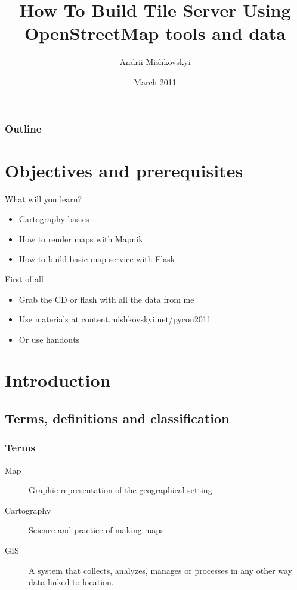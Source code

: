 \documentclass{beamer}
\begin{document}
\title{How To Build Tile Server Using OpenStreetMap tools and data}
\author{Andrii Mishkovskyi}
\date{March 2011}

\maketitle

\begin{frame}
  \frametitle{Outline}
  \tableofcontents
\end{frame}


\section{Objectives and prerequisites}

\begin{frame}{What will you learn?}
  \begin{itemize}
  \item Cartography basics
  \item How to render maps with Mapnik
  \item How to build basic map service with Flask
  \end{itemize}
\end{frame}

\begin{frame}{First of all}
  \begin{itemize}
  \item Grab the CD or flash with all the data from me
  \item Use materials at content.mishkovskyi.net/pycon2011
  \item Or use handouts
  \end{itemize}
\end{frame}

\section{Introduction}

\subsection{Terms, definitions and classification}

\begin{frame}
  \frametitle{Terms}
  \begin{description}
  \item[Map] Graphic representation of the geographical setting
  \item[Cartography] Science and practice of making maps
  \item[GIS] A system that collects, analyzes, manages or processes in any other way data linked to location.
  \end{description}
\end{frame}
\end{document}
